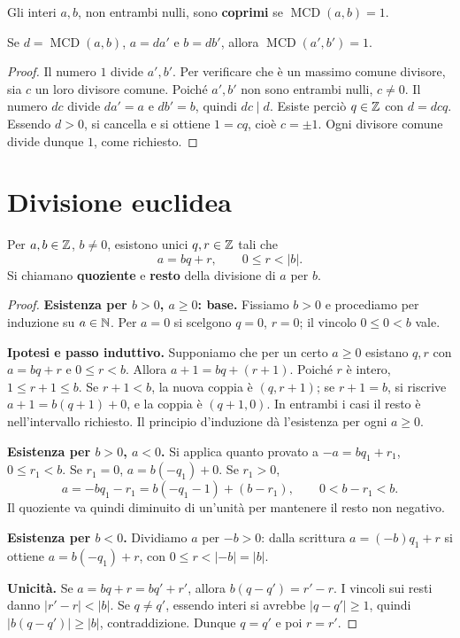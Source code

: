 \begin{definizione}
Gli interi $a,b$, non entrambi nulli, sono \textbf{coprimi} se $\operatorname{MCD}(a,b)=1$.
\end{definizione}

\begin{proposizione}
Se $d=\operatorname{MCD}(a,b)$, $a=da'$ e $b=db'$, allora $\operatorname{MCD}(a',b')=1$.
\end{proposizione}
\begin{proof}
Il numero $1$ divide $a',b'$. Per verificare che è un massimo comune divisore, sia $c$ un loro divisore comune. Poiché $a',b'$ non sono entrambi nulli, $c\ne0$. Il numero $dc$ divide $da'=a$ e $db'=b$, quindi $dc\mid d$. Esiste perciò $q\in\mathbb{Z}$ con $d=dcq$. Essendo $d>0$, si cancella e si ottiene $1=cq$, cioè $c=\pm1$. Ogni divisore comune divide dunque $1$, come richiesto.
\end{proof}

\section{Divisione euclidea}
\begin{teorema}\label{teo:divisione}
Per $a,b\in\mathbb{Z}$, $b\ne0$, esistono unici $q,r\in\mathbb{Z}$ tali che
\[
a=bq+r,\qquad 0\le r<|b|.
\]
Si chiamano \textbf{quoziente} e \textbf{resto} della divisione di $a$ per $b$.
\end{teorema}
\begin{proof}
\textbf{Esistenza per $b>0$, $a\ge0$: base.} Fissiamo $b>0$ e procediamo per induzione su $a\in\mathbb{N}$. Per $a=0$ si scelgono $q=0$, $r=0$; il vincolo $0\le0<b$ vale.

\textbf{Ipotesi e passo induttivo.} Supponiamo che per un certo $a\ge0$ esistano $q,r$ con $a=bq+r$ e $0\le r<b$. Allora $a+1=bq+(r+1)$. Poiché $r$ è intero, $1\le r+1\le b$. Se $r+1<b$, la nuova coppia è $(q,r+1)$; se $r+1=b$, si riscrive $a+1=b(q+1)+0$, e la coppia è $(q+1,0)$. In entrambi i casi il resto è nell'intervallo richiesto. Il principio d'induzione dà l'esistenza per ogni $a\ge0$.

\textbf{Esistenza per $b>0$, $a<0$.} Si applica quanto provato a $-a=bq_1+r_1$, $0\le r_1<b$. Se $r_1=0$, $a=b(-q_1)+0$. Se $r_1>0$,
\[
a=-bq_1-r_1=b(-q_1-1)+(b-r_1),\qquad 0<b-r_1<b.
\]
Il quoziente va quindi diminuito di un'unità per mantenere il resto non negativo.

\textbf{Esistenza per $b<0$.} Dividiamo $a$ per $-b>0$: dalla scrittura $a=(-b)q_1+r$ si ottiene $a=b(-q_1)+r$, con $0\le r<|-b|=|b|$.

\textbf{Unicità.} Se $a=bq+r=bq'+r'$, allora $b(q-q')=r'-r$. I vincoli sui resti danno $|r'-r|<|b|$. Se $q\ne q'$, essendo interi si avrebbe $|q-q'|\ge1$, quindi $|b(q-q')|\ge|b|$, contraddizione. Dunque $q=q'$ e poi $r=r'$.
\end{proof}

